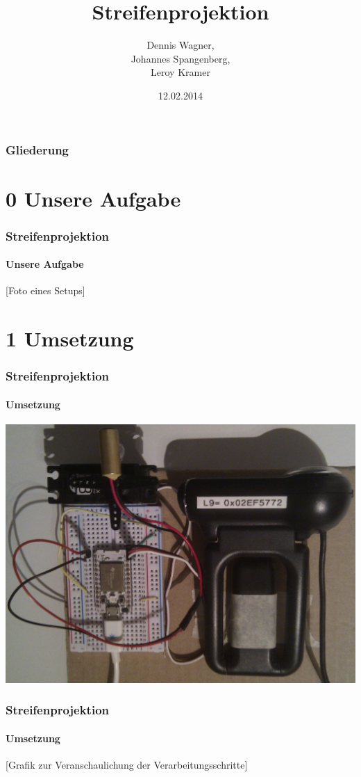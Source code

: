\documentclass{beamer}
\title{Streifenprojektion}
\author{Dennis Wagner, \\ Johannes Spangenberg, \\ Leroy Kramer}
\date{12.02.2014}
\begin{document}
\frame{\titlepage} 


\begin{frame}
	\frametitle{Gliederung}
	\tableofcontents
\end{frame} 


\section{0 \hspace{5px} Unsere Aufgabe} 
\begin{frame}
	\frametitle{Streifenprojektion}
	\framesubtitle{Unsere Aufgabe}

	[Foto eines Setups]

\end{frame}


\section{1 \hspace{5px} Umsetzung} 
\begin{frame}
	\frametitle{Streifenprojektion}
	\framesubtitle{Umsetzung}

	\includegraphics[width=0.9\linewidth]{includes/hardware.jpg}

\end{frame}


\begin{frame}
	\frametitle{Streifenprojektion}
	\framesubtitle{Umsetzung}

	[Grafik zur Veranschaulichung der Verarbeitungsschritte]

\end{frame}
\end{document}
